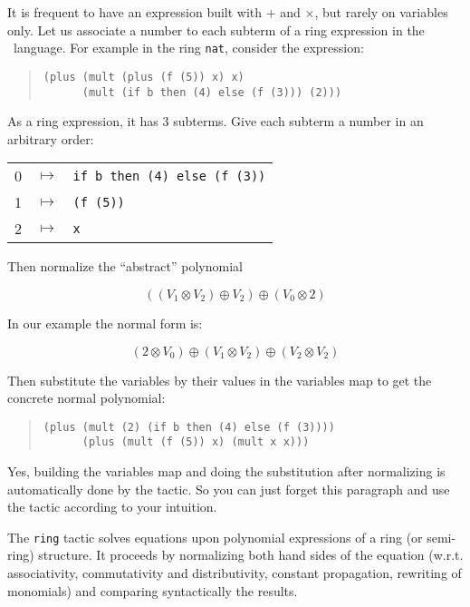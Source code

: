 It is frequent to have an expression built with + and
  $\times$, but rarely on variables only.
Let us associate a number to each subterm of a ring
expression in the \gallina\ language. For example in the ring
\texttt{nat}, consider the expression:

\begin{quotation}
\begin{verbatim}
(plus (mult (plus (f (5)) x) x)
      (mult (if b then (4) else (f (3))) (2)))
\end{verbatim}
\end{quotation}

\noindent As a ring expression, it has 3 subterms. Give each subterm a
number in an arbitrary order:

\begin{tabular}{ccl}
0 & $\mapsto$ & \verb|if b then (4) else (f (3))| \\
1 & $\mapsto$ & \verb|(f (5))| \\
2 & $\mapsto$ & \verb|x| \\
\end{tabular}

\noindent Then normalize the ``abstract'' polynomial 

$$((V_1 \otimes V_2) \oplus V_2) \oplus (V_0 \otimes 2) $$

\noindent In our example the normal form is:

$$(2 \otimes V_0) \oplus (V_1 \otimes V_2) \oplus (V_2 \otimes V_2)$$

\noindent Then substitute the variables by their values in the variables map to
get the concrete normal polynomial:

\begin{quotation}
\begin{verbatim}
(plus (mult (2) (if b then (4) else (f (3)))) 
      (plus (mult (f (5)) x) (mult x x))) 
\end{verbatim}
\end{quotation}


Yes, building the variables map and doing the substitution after
normalizing is automatically done by the tactic. So you can just forget
this paragraph and use the tactic according to your intuition.


The {\tt ring} tactic solves equations upon polynomial expressions of
a ring (or semi-ring) structure. It proceeds by normalizing both hand
sides of the equation (w.r.t. associativity, commutativity and
distributivity, constant propagation, rewriting of monomials) 
and comparing syntactically the results.

